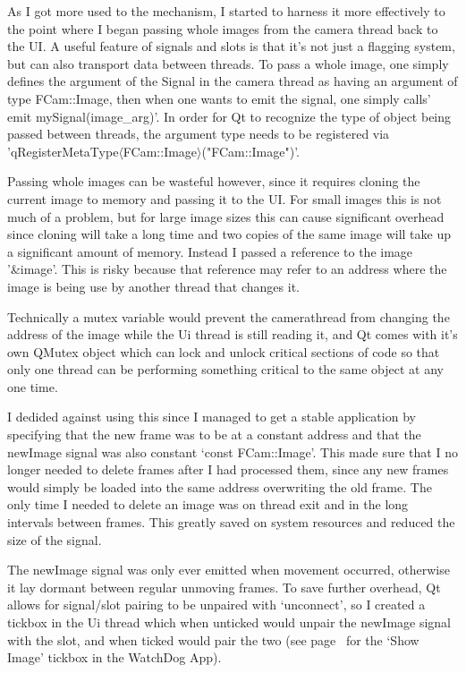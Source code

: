 {{As I got more used to the mechanism, I started to harness it more effectively to the point where I began passing whole images from the camera thread back to the UI. A useful feature of signals and slots is that it's not just a flagging system, but can also transport data between threads.  To pass a whole image, one simply defines the argument of the Signal in the camera thread as having an argument of type FCam::Image, then when one wants to emit the signal, one simply calls' emit mySignal(image\_arg)'. In order for Qt to recognize the type of object being passed between threads, the argument type needs to be registered via 'qRegisterMetaType\(\langle\)FCam::Image\(\rangle\)("FCam::Image")'.

Passing whole images can be wasteful however, since it requires cloning the current image to memory and passing it to the UI. For small images this is not much of a problem, but for large image sizes this can cause significant overhead since cloning will take a long time and two copies of the same image will take up a significant amount of memory. Instead I passed a reference to the image '\&image'. This is risky because that reference may refer to an address where the image is being use by another thread that changes it. 

Technically a mutex variable would prevent the camerathread from changing the address of the image while the Ui thread is still reading it, and Qt comes with it’s own QMutex object which can lock and unlock critical sections of code so that only one thread can be performing something critical to the same object at any one time.

I dedided against using this since I managed to get a stable application by specifying that the new frame was to be at a constant address and that the newImage signal was also constant ‘const FCam::Image’. This made sure that I no longer needed to delete frames after I had processed them, since any new frames would simply be loaded into the same address overwriting the old frame. The only time I needed to delete an image was on thread exit and in the long intervals between frames. This greatly saved on system resources and reduced the size of the signal.

The newImage signal was only ever emitted when movement occurred, otherwise it lay dormant between regular unmoving frames.
To save further overhead, Qt allows for signal/slot pairing to be unpaired with ‘unconnect’, so I created a tickbox in the Ui thread which when unticked would unpair the newImage signal with the slot, and when ticked would pair the two (see page~\pageref{guimap} for the ‘Show Image’ tickbox in the WatchDog App).

}}
